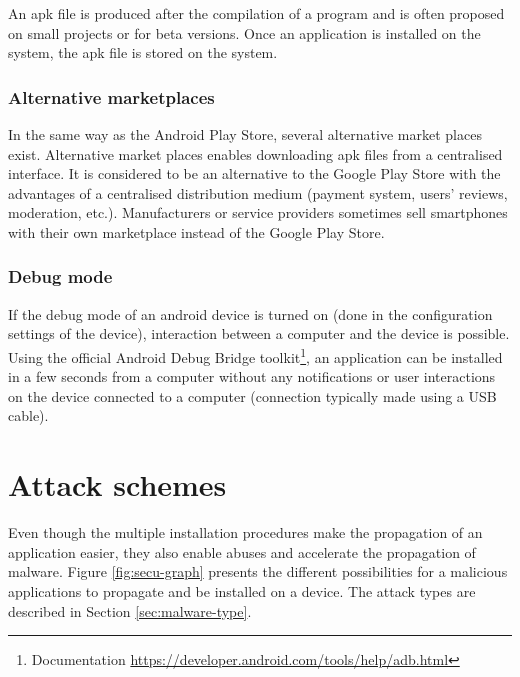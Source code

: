 An apk file is produced after the compilation of a program and is often proposed on small projects or for beta versions.
Once an application is installed on the system, the apk file is stored on the system.

\subsubsection{Alternative marketplaces}

In the same way as the Android Play Store, several alternative market places exist.
Alternative market places enables downloading apk files from a centralised interface.
It is considered to be an alternative to the Google Play Store with the advantages of a centralised distribution medium (payment system, users' reviews, moderation, etc.).
Manufacturers or service providers sometimes sell smartphones with their own marketplace instead of the Google Play Store.\\

\subsubsection{Debug mode}
If the debug mode of an android device is turned on (done in the configuration settings of the device), interaction between a computer and the device is possible.
Using the official Android Debug Bridge toolkit\footnote{Documentation \url{https://developer.android.com/tools/help/adb.html}}, an application can be installed in a few seconds from a computer without any notifications or user interactions on the device connected to a computer (connection typically made using a USB cable).

\section{Attack schemes}
\label{sec:and-attack-scheme}

Even though the multiple installation procedures make the propagation of an application easier, they also enable abuses and accelerate the propagation of malware.
Figure \ref{fig:secu-graph} presents the different possibilities for a malicious applications to propagate and be installed on a device.
The attack types are described in Section \ref{sec:malware-type}.

